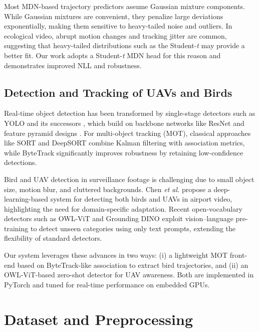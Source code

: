 \documentclass[journal]{IEEEtran}
\begin{document}
Most MDN-based trajectory predictors assume Gaussian mixture components. While Gaussian mixtures are convenient, they penalize large deviations exponentially, making them sensitive to heavy-tailed noise and outliers. In ecological video, abrupt motion changes and tracking jitter are common, suggesting that heavy-tailed distributions such as the Student-\textit{t} may provide a better fit. Our work adopts a Student-\textit{t} MDN head for this reason and demonstrates improved NLL and robustness.

\subsection{Detection and Tracking of UAVs and Birds}

Real-time object detection has been transformed by single-stage detectors such as YOLO \cite{Redmon2016YOLO} and its successors \cite{Bochkovskiy2020YOLOv4,Ge2021YOLOX}, which build on backbone networks like ResNet \cite{He2016ResNet} and feature pyramid designs \cite{Lin2017FPN}. For multi-object tracking (MOT), classical approaches like SORT \cite{Bewley2016SORT} and DeepSORT \cite{Wojke2017DeepSORT} combine Kalman filtering with association metrics, while ByteTrack \cite{Zhang2021ByteTrack} significantly improves robustness by retaining low-confidence detections.

Bird and UAV detection in surveillance footage is challenging due to small object size, motion blur, and cluttered backgrounds. Chen \textit{et al.} \cite{Chen2020BirdUAV} propose a deep-learning-based system for detecting both birds and UAVs in airport video, highlighting the need for domain-specific adaptation. Recent open-vocabulary detectors such as OWL-ViT \cite{Minderer2022OWLViT} and Grounding DINO \cite{Chen2023GroundingDINO} exploit vision--language pre-training to detect unseen categories using only text prompts, extending the flexibility of standard detectors.

Our system leverages these advances in two ways: (i) a lightweight MOT front-end based on ByteTrack-like association to extract bird trajectories, and (ii) an OWL-ViT-based zero-shot detector for UAV awareness. Both are implemented in PyTorch \cite{Paszke2019PyTorch} and tuned for real-time performance on embedded GPUs.










\section{Dataset and Preprocessing}
\label{sec:dataset}
\end{document}
